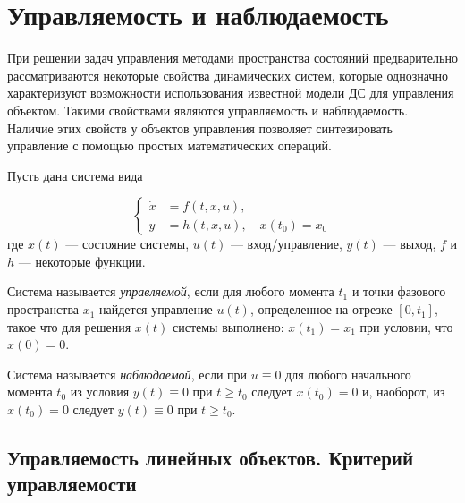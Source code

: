\documentclass[../../TAU.tex]{subfiles}
\begin{document}
\section{Управляемость и наблюдаемость \cite[стр. 269]{voron}}

    При решении задач управления методами пространства состояний предварительно рассматриваются некоторые свойства динамических систем, которые однозначно характеризуют возможности использования известной модели ДС для управления объектом. 
    Такими свойствами являются управляемость и наблюдаемость. 
    Наличие этих свойств у объектов управления позволяет синтезировать управление с помощью простых математических операций.
    \cite[стр. 62]{yashin} 

    Пусть дана система вида

    \begin{equation}\label{GEN_DS}
        \left\{
        \begin{aligned}
            \dot x &= f(t,x,u),\\
            y &= h(t,x,u),\quad x(t_0) = x_0
        \end{aligned}
        \right.
    \end{equation}
    где $x(t)$ --- состояние системы, $u(t)$ --- вход/управление, $y(t)$ --- выход, $f$ и $h$ --- некоторые функции.

    \begin{defi}
        Система  называется {\it управляемой}, если для любого момента $t_1$ и точки фазового пространства $x_1$ найдется управление $u(t)$, определенное на отрезке $[0,t_1]$, такое что для решения $x(t)$ системы  выполнено: $x(t_1) = x_1$ при условии, что $x(0)=0$.
    \end{defi}

    \begin{defi}
        Система  называется {\it наблюдаемой}, если при $u\equiv0$ для любого начального момента $t_0$ из условия $y(t)\equiv 0$ при $t\ge t_0$ следует $x(t_0) = 0$ и, наоборот, из $x(t_0)=0$ следует $y(t)\equiv0$ при $t\ge t_0$.
    \end{defi}

\subsection{Управляемость линейных объектов. Критерий управляемости}
\end{document}
